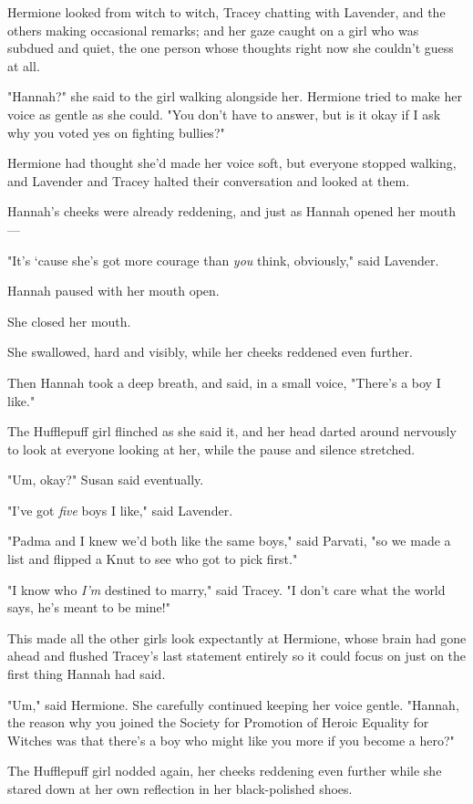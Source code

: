 Hermione looked from witch to witch, Tracey chatting with Lavender, and the
others making occasional remarks; and her gaze caught on a girl who was subdued
and quiet, the one person whose thoughts right now she couldn't guess at all.

"Hannah?" she said to the girl walking alongside her. Hermione tried to make
her voice as gentle as she could. "You don't have to answer, but is it okay if
I ask why you voted yes on fighting bullies?"

Hermione had thought she'd made her voice soft, but everyone stopped walking,
and Lavender and Tracey halted their conversation and looked at them.

Hannah's cheeks were already reddening, and just as Hannah opened her mouth—

"It's `cause she's got more courage than \emph{you} think, obviously," said
Lavender.

Hannah paused with her mouth open.

She closed her mouth.

She swallowed, hard and visibly, while her cheeks reddened even further.

Then Hannah took a deep breath, and said, in a small voice, "There's a boy I
like."

The Hufflepuff girl flinched as she said it, and her head darted around
nervously to look at everyone looking at her, while the pause and silence
stretched.

"Um, okay?" Susan said eventually.

"I've got \emph{five} boys I like," said Lavender.

"Padma and I knew we'd both like the same boys," said Parvati, "so we made a
list and flipped a Knut to see who got to pick first."

"I know who \emph{I'm} destined to marry," said Tracey. "I don't care what the
world says, he's meant to be mine!"

This made all the other girls look expectantly at Hermione, whose brain had
gone ahead and flushed Tracey's last statement entirely so it could focus on
just on the first thing Hannah had said.

"Um," said Hermione. She carefully continued keeping her voice gentle. "Hannah,
the reason why you joined the Society for Promotion of Heroic Equality for
Witches was that there's a boy who might like you more if you become a hero?"

The Hufflepuff girl nodded again, her cheeks reddening even further while she
stared down at her own reflection in her black-polished shoes.

